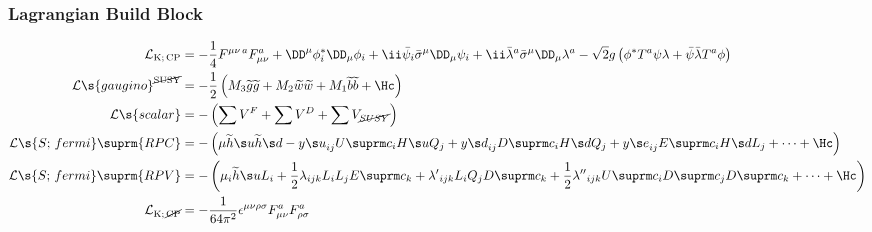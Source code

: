 \subsubsection{Lagrangian Build Block}
\vspace{-25pt}
\begin{align}
 \Lag_{\text{K;\,CP}}&=
- \frac14F^{\mu\nu\,a}F_{\mu\nu}^a
+ \Dmu\phi_i^*\Dm\phi_i
+ \ii\bar\psi_i\bSm\Dm\psi_i
+ \ii\bar\lambda^a\bSm\Dm\lambda^a
- \sqrt2g\left(\phi^*T^a\psi\lambda+\bar\psi\bar\lambda T^a\phi\right)
\\\Lag\s{gaugino}^{\text{\cancel{SUSY}}}&=
- \frac12\left(M_3\gno\gno+M_2\wno\wno+M_1\bno\bno+\Hc\right)
\\\Lag\s{scalar}&=-\left(\sum V^F+\sum V^D+\sum V_{\cancel{SUSY}}\right)
\\\Lag\s{S;\,fermi}\suprm{RPC}&=
-\left(
   \mu\Hnou\Hnod
 - {y\s u}_{ij} \Uc_i\Hu Q_j
 + {y\s d}_{ij} \Dc_i\Hd Q_j
 + {y\s e}_{ij} \Ec_i\Hd L_j+\cdots
+\Hc
\right)
\\\Lag\s{S;\,fermi}\suprm{RPV}&=
-\left(
 \mu_i\Hnou L_i
 + \frac12{\lambda  }_{ijk} L_i L_j \Ec_k
 + {\lambda' }_{ijk} L_i Q_j \Dc_k
 + \frac12{\lambda''}_{ijk} \Uc_i \Dc_j \Dc_k
 + \cdots + \Hc\right)
\\\Lag_{\text{K;\,\cancel{CP}}} &=
-\frac1{64\pi^2}\epsilon^{\mu\nu\rho\sigma}F_{\mu\nu}^aF_{\rho\sigma}^a
\end{align}

